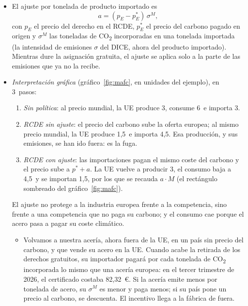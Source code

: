\documentclass[11pt]{article}
\begin{document}
\begin{itemize}
\item El ajuste por tonelada de producto importado es
  \begin{equation}\label{eq:mafc}
  a=(p_E-p_E^*)\,\sigma^M,
  \end{equation}
  con $p_E$ el precio del derecho en el RCDE, $p_E^*$ el precio del carbono pagado en origen y $\sigma^M$ las toneladas de CO\textsubscript{2} incorporadas en una tonelada importada (la intensidad de emisiones $\sigma$ del DICE, ahora del producto importado). Mientras dure la asignación gratuita, el ajuste se aplica solo a la parte de las emisiones que ya no la recibe.
\item \emph{Interpretación gráfica} (gráfico~\ref{fig:mafc}, en unidades del ejemplo), en 3~pasos:
  \begin{enumerate}
  \item \emph{Sin política}: al precio mundial, la UE produce 3, consume 6~e importa 3.
  \item \emph{RCDE sin ajuste}: el precio del carbono sube la oferta europea; al mismo precio mundial, la UE produce 1,5~e importa 4,5. Esa producción, y sus emisiones, se han ido fuera: es la fuga.
  \item \emph{RCDE con ajuste}: las importaciones pagan el mismo coste del carbono y el precio sube a $p^*+a$. La UE vuelve a producir 3, el consumo baja a 4,5~y se importan 1,5, por los que se recauda $a\cdot M$ (el rectángulo sombreado del gráfico~\ref{fig:mafc}).
  \end{enumerate}
  El ajuste no protege a la industria europea frente a la competencia, sino frente a una competencia que no paga su carbono; y el consumo cae porque el acero pasa a pagar su coste climático.
  \begin{itemize}
  \item Volvamos a nuestra acería, ahora fuera de la UE, en un país sin precio del carbono, y que vende su acero en la UE. Cuando acabe la retirada de los derechos gratuitos, su importador pagará por cada tonelada de CO\textsubscript{2} incorporada lo mismo que una acería europea: en el tercer trimestre de 2026, el certificado costaba 82,32~€\nocite{CE2026PrecioCBAM}. Si la acería emite menos por tonelada de acero, su $\sigma^M$ es menor y paga menos; si su país pone un precio al carbono, se descuenta. El incentivo llega a la fábrica de fuera.
  \end{itemize}
\end{itemize}
\end{document}
